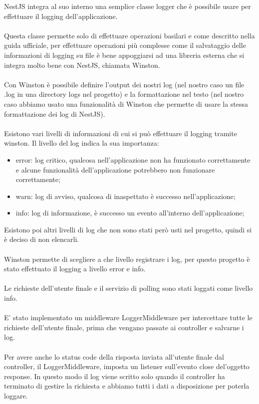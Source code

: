 NestJS integra al suo interno una semplice classe logger che è possibile usare per effettuare il logging 
dell'applicazione. 
\\\\
Questa classe permette solo di effettuare operazioni basilari e come descritto nella 
guida ufficiale, per effettuare operazioni più complesse come il salvataggio delle informazioni di 
logging su file è bene appoggiarsi ad una libreria esterna che si integra molto bene con NestJS, chiamata
Winston.
\\\\
Con Winston è possibile definire l'output dei nostri log (nel nostro caso un file .log in una directory logs nel
progetto) e la formattazione nel testo (nel nostro caso abbiamo usato una funzionalità di Winston che permette
di usare la stessa formattazione dei log di NestJS).
\\\\
Esistono vari livelli di informazioni di cui si può effettuare il logging tramite winston. Il livello del log 
indica la sua importanza:
\begin{itemize}
    \item error: log critico, qualcosa nell'applicazione non ha funzionato correttamente e
        alcune funzionalità dell'applicazione potrebbero non funzionare correttamente;
    \item warn: log di avviso, qualcosa di inaspettato è successo nell'applicazione;
    \item info: log di informazione, è successo un evento all'interno dell'applicazione;
\end{itemize}
\leavevmode\newline
Esistono poi altri livelli di log che non sono stati però usti nel progetto, quindi si è deciso di non elencarli.
\\\\
Winston permette di scegliere a che livello registrare i log, per questo progetto è stato effettuato il logging
a livello error e info.
\\\\
Le richieste dell'utente finale e il servizio di polling sono stati loggati come livello info.
\\\\
E' stato implementato un middleware LoggerMiddleware per intercettare tutte le richieste dell'utente finale, prima che 
vengano passate ai controller e salvarne i log.
\\\\
Per avere anche lo status code della risposta inviata all'utente finale dal controller, il LoggerMiddleware, imposta un 
listener sull'evento close del'oggetto response. In questo modo il log viene scritto solo quando il controller ha terminato di
gestire la richiesta e abbiamo tutti i dati a disposizione per poterla loggare.

